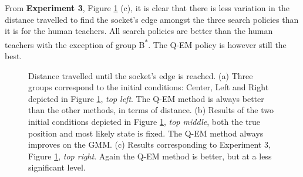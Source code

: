 From \textbf{Experiment 3}, Figure \ref{fig:three_searches} (c), it is clear that there is less variation in the distance travelled to find the socket's 
edge amongst the three search policies than it is for the human teachers. All search policies are better than the human teachers 
with the exception of group B\textsuperscript{*}. The Q-EM policy is however still the best. 

\begin{figure}
 \centering
   \hfill
   \hfill
   \caption{Distance travelled until the socket's edge is reached. (a) Three groups correspond to the initial conditions: Center, Left and Right
   depicted in Figure \ref{fig:three_searches}, \textit{top left}. The Q-EM method is always better than the other methods, in terms of distance. (b)
   Results of the two initial conditions depicted in Figure \ref{fig:three_searches}, \textit{top middle}, both the true position and most likely state is
   fixed. The Q-EM method always improves on the GMM. (c) Results corresponding to Experiment 3, Figure \ref{fig:three_searches}, \textit{top right}.
   Again the Q-EM method is better, but at a less significant level.}
   \label{fig:three_searches}
\end{figure}


